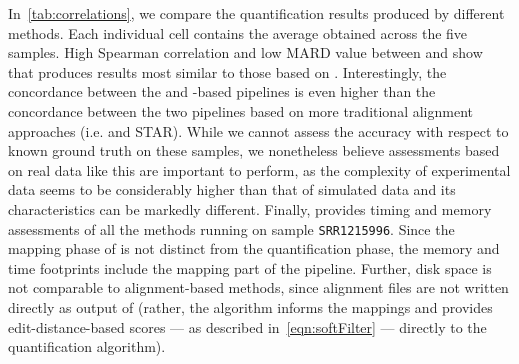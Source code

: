 In~\cref{tab:correlations}, we compare the quantification results produced by different methods. Each 
individual cell contains the average obtained across the five samples. High Spearman correlation and low MARD 
value between \bt and \sla show that \sla produces results most similar to those based on \bt. Interestingly, 
the concordance between the \sla and \bt-based pipelines is even higher than the concordance between the two 
pipelines based on more traditional alignment approaches (i.e. \bt and STAR). While we cannot assess the accuracy 
with respect to known ground truth on these samples, we nonetheless believe assessments based on real data like 
this are important to perform, as the complexity of experimental data seems to be considerably higher than that 
of simulated data and its characteristics can be markedly different. Finally,  
provides timing and memory assessments of all the methods running on sample \texttt{SRR1215996}. Since the 
mapping phase of \sla is not distinct from the quantification phase, the memory and time footprints include 
the mapping part of the pipeline.  Further, disk space is not comparable to alignment-based methods, since 
alignment files are not written directly as output of \sla (rather, the \sla algorithm informs the mappings 
and provides edit-distance-based scores --- as described in~\cref{eqn:softFilter} --- directly to the 
quantification algorithm).

